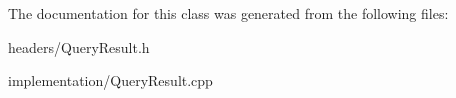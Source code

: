The documentation for this class was generated from the following files\-:\begin{DoxyCompactItemize}
\item 
headers/Query\-Result.\-h\item 
implementation/Query\-Result.\-cpp\end{DoxyCompactItemize}
